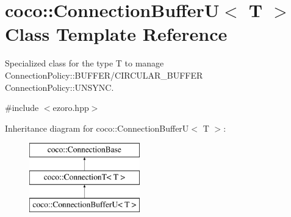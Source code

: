 \hypertarget{classcoco_1_1_connection_buffer_u}{\section{coco\-:\-:Connection\-Buffer\-U$<$ T $>$ Class Template Reference}
\label{classcoco_1_1_connection_buffer_u}
}


Specialized class for the type T to manage Connection\-Policy\-::\-B\-U\-F\-F\-E\-R/\-C\-I\-R\-C\-U\-L\-A\-R\-\_\-\-B\-U\-F\-F\-E\-R Connection\-Policy\-::\-U\-N\-S\-Y\-N\-C.  




{\ttfamily \#include $<$ezoro.\-hpp$>$}

Inheritance diagram for coco\-:\-:Connection\-Buffer\-U$<$ T $>$\-:\begin{figure}[H]
\begin{center}
\leavevmode
\includegraphics[height=3.000000cm]{classcoco_1_1_connection_buffer_u}
\end{center}
\end{figure}
